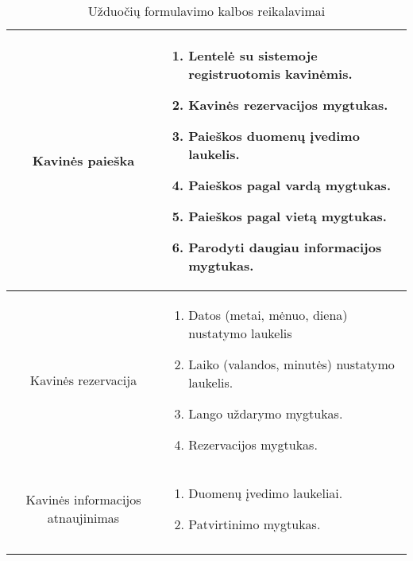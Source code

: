 \documentclass{VUMIFPSkursinis}
\begin{document}
\begin{center}
\begin{longtable}{|p{2cm}|p{16cm}|}
	\hline	
		
		\multicolumn{1}{|c|}{Kavinės paieška}&
		\multicolumn{1}{|p{10,2cm}|}{
			\begin{enumerate}
				\item Lentelė su sistemoje registruotomis kavinėmis.
				\item Kavinės rezervacijos mygtukas.
				\item Paieškos duomenų įvedimo laukelis.
				\item Paieškos pagal vardą mygtukas.
				\item Paieškos pagal vietą mygtukas.
				\item Parodyti daugiau informacijos mygtukas.
			\end{enumerate}}\\
	
	\hline 	
		\multicolumn{1}{|c|}{Kavinės rezervacija}&
		\multicolumn{1}{|p{10,2cm}|}{
			\begin{enumerate}
				\item Datos (metai, mėnuo, diena) nustatymo laukelis
				\item Laiko (valandos, minutės) nustatymo laukelis.
				\item Lango uždarymo mygtukas.
				\item Rezervacijos mygtukas.
			\end{enumerate}}\\
	
	\hline 	
		\multicolumn{1}{|c|}{Kavinės informacijos atnaujinimas}&
		\multicolumn{1}{|p{8,6cm}|}{
			\begin{enumerate}
				\item Duomenų įvedimo laukeliai.
				\item Patvirtinimo mygtukas.
			\end{enumerate}}\\
	
	\hline
	\caption{Užduočių formulavimo kalbos reikalavimai}
	\label{table:3}	
	\end{longtable}

\end{center}
\end{document}
